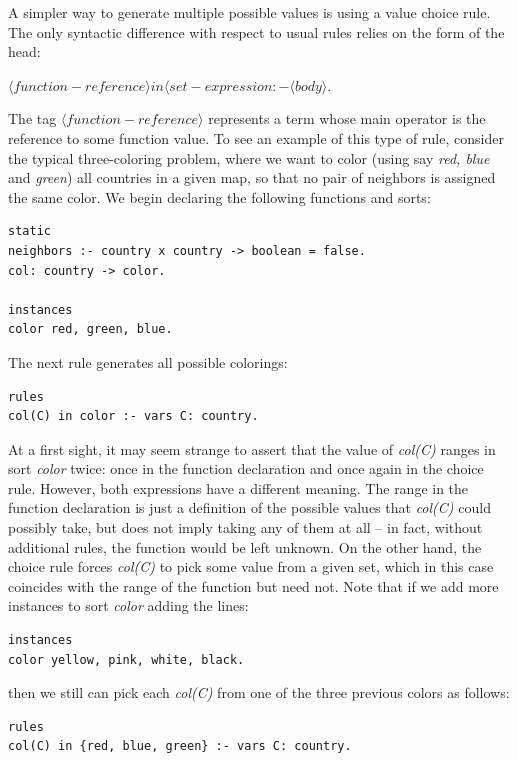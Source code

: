 \documentclass[a4paper,12pt]{report}
\begin{document}
A simpler way to generate multiple possible values is using a {\color{orange}value choice} rule. The only syntactic difference with respect to usual rules relies on the form of the head:

$ \langle function-reference \rangle in \langle set-expression :- \langle body \rangle .$

The tag $\langle function-reference \rangle$  represents a term whose main operator is the reference to some function value. To see an example of this type of rule, consider the typical three-coloring problem, where we want to color (using say \textit{red, blue} and \textit{green}) all countries in a given map, so that no pair of neighbors is assigned the same color. We begin declaring the following functions and sorts:

\begin{verbatim}
static
neighbors :- country x country -> boolean = false.
col: country -> color.

instances
color red, green, blue.
\end{verbatim}

The next rule generates all possible colorings:

\begin{verbatim}
rules
col(C) in color :- vars C: country.
\end{verbatim}

At a first sight, it may seem strange to assert that the value of \textit{col(C)} ranges in sort \textit{color} twice: once in the function declaration and once again in the choice rule. However, both expressions have a different meaning. The range in the function declaration is just a definition of the possible values that \textit{col(C)} could possibly take, but does not imply taking any of them at all -- in fact, without additional rules, the function would be left unknown. On the other hand, the choice rule forces \textit{col(C)} to pick some value from a given set, which in this case coincides with the range of the function but need not. Note that if we add more instances to sort \textit{color} adding the lines:

\begin{verbatim}
instances 
color yellow, pink, white, black.
\end{verbatim}

then we still can pick each \textit{col(C)} from one of the three previous colors as follows:

\begin{verbatim}
rules
col(C) in {red, blue, green} :- vars C: country.
\end{verbatim}
\end{document}
